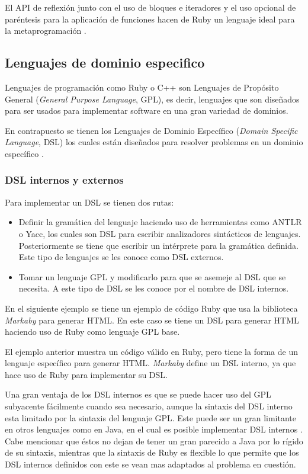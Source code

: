El API de reflexión junto con el uso de bloques e iteradores y el uso opcional de
paréntesis para la aplicación de funciones hacen de Ruby un lenguaje
ideal para la metaprogramación \cite{24_matsumoto_2008}.

\subsection{Lenguajes de dominio especifico}

Lenguajes de programación como Ruby o C++ son Lenguajes de Propósito General
(\textit{General Purpose Language}, GPL), es decir, lenguajes que son diseñados
para ser usados para implementar software en una gran variedad de dominios.

En contrapuesto se tienen los Lenguajes de Dominio Específico
(\textit{Domain Specific Language}, DSL) los cuales están diseñados para resolver
problemas en un dominio específico \cite{25_shriram_2003}.

\subsubsection{DSL internos y externos}

Para implementar un DSL se tienen dos rutas:
\begin{itemize}
\item Definir la gramática del lenguaje haciendo uso de herramientas como
  ANTLR o Yacc, los cuales son DSL para escribir analizadores sintácticos
  de lenguajes. Posteriormente se tiene que escribir un intérprete para
  la gramática definida. Este tipo de lenguajes se les conoce como DSL externos.
\item Tomar un lenguaje GPL y modificarlo para que se asemeje al DSL que
  se necesita. A este tipo de DSL se les conoce por el nombre de DSL internos.
\end{itemize}

En el siguiente ejemplo se tiene un ejemplo de código Ruby que usa la biblioteca
\textit{Markaby} para generar HTML. En este caso se tiene un DSL para generar HTML
haciendo uso de Ruby como lenguaje GPL base.


El ejemplo anterior muestra un código válido en Ruby, pero tiene la forma de un
lenguaje específico para generar HTML. \textit{Markaby} define un DSL interno,
ya que hace uso de Ruby para implementar su DSL.

Una gran ventaja de los DSL internos es que se puede hacer uso del GPL subyacente
fácilmente cuando sea necesario, aunque la sintaxis del DSL interno esta limitado
por la sintaxis del lenguaje GPL. Este puede ser un gran limitante en otros lenguajes
como en Java, en el cual es posible implementar DSL internos \cite{25_shriram_2003}.
Cabe mencionar que éstos no dejan de tener un gran parecido a Java por lo rígido de
su sintaxis, mientras que la sintaxis de Ruby es flexible lo que permite que los DSL
internos definidos con este se vean mas adaptados al problema en cuestión.

